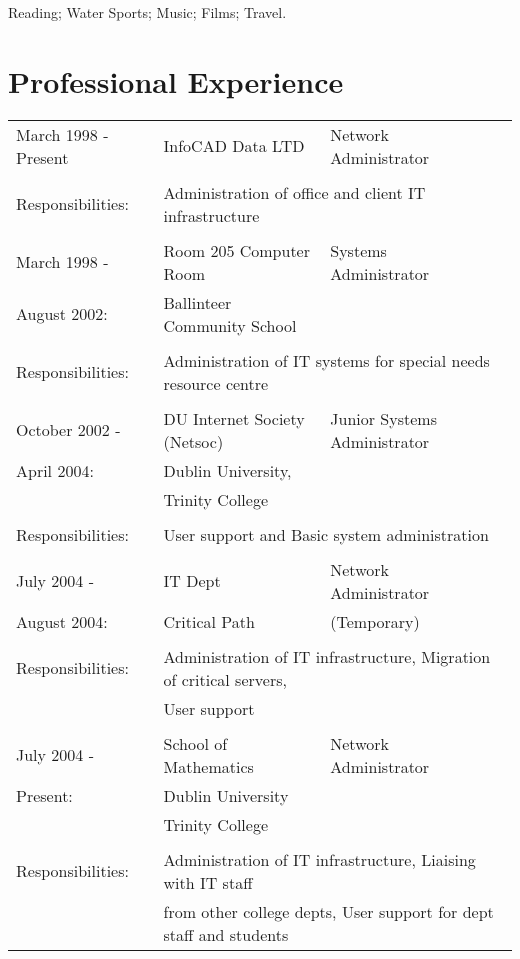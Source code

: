 \documentclass[a4paper, 11pt] {article}
\begin{document}
Reading; Water Sports; Music; Films; Travel.

\section*{Professional Experience}

\begin{tabular}{llll}
March 1998 - Present	&	InfoCAD Data LTD	& Network Administrator	&	\hspace{10mm}	\\
      	&			&              &            			\\
Responsibilities:	& \multicolumn{3}{l}{Administration of office and client IT infrastructure} 	\\
      				&              						&  &	\\
March 1998 -		& 	Room 205 Computer Room			&	Systems Administrator	& \hspace{10mm}	\\
August 2002:		&  Ballinteer Community School	&	&	\\
						& 		&	\\
Responsibilities:	& \multicolumn{3}{l}{Administration of IT systems for special needs resource centre} 	\\
						&                      				&	&	\\
October 2002 - 	&  DU Internet Society (Netsoc)	&	Junior Systems Administrator	& \hspace{10mm}\\
April 2004:			& 	Dublin University,				&	&	\\
						&  Trinity College					&	&	\\
						& 											&	&	\\
Responsibilities:	& \multicolumn{3}{l}{User support and Basic system administration} 	\\
						&											&	&	\\
July 2004 -			& IT Dept								&	Network Administrator			& \hspace{10mm}\\
August 2004:		& Critical Path						& (Temporary)	&	\\
						& 											&	&	\\
Responsibilities:	& \multicolumn{3}{l}{Administration of IT infrastructure, Migration of critical servers,}	\\ 
						& \multicolumn{3}{l}{User support} 	\\
						&												&\\
July 2004 -			& 	School of Mathematics	&	Network Administrator &	\\
Present:				& 	Dublin University			&	&	\\
						& 	Trinity College			&	&	\\
						& 									&	&	\\
Responsibilities:	& \multicolumn{3}{l}{Administration of IT infrastructure, Liaising with IT staff}	\\ 
						& \multicolumn{3}{l}{from other college depts, User support for dept staff and students} 	\\
\end{tabular}
\end{document}
